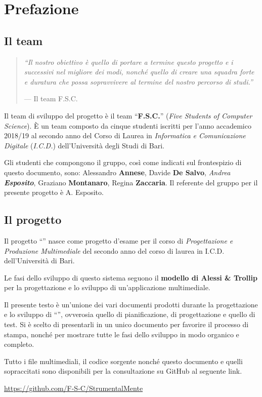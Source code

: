 \chapter*{Prefazione}
\section*{Il team}

\begin{quote}
\flushright \emph{``Il nostro obiettivo è quello di portare a termine questo progetto e i successivi nel migliore dei modi, nonché quello di creare una squadra forte e duratura che possa sopravvivere al termine del nostro percorso di studi.''}

--- Il team F.S.C.
\end{quote}

Il team di sviluppo del progetto è il team ``\textbf{F.S.C.}'' (\emph{Five Students of Computer Science}). È un team composto da cinque studenti iscritti per l'anno accademico 2018/19 al secondo anno del Corso di Laurea in \emph{Informatica e Comunicazione Digitale} (\emph{I.C.D.}) dell'Università degli Studi di Bari. 

Gli studenti che compongono il gruppo, così come indicati sul frontespizio di questo documento, sono: Alessandro \textbf{Annese}, Davide \textbf{De Salvo}, \emph{Andrea \textbf{Esposito}}, Graziano \textbf{Montanaro}, Regina \textbf{Zaccaria}. Il referente del gruppo per il presente progetto è A. Esposito.

\section*{Il progetto}
Il progetto ``\ProjectTitle{}'' nasce come progetto d'esame per il corso di \emph{Progettazione e Produzione Multimediale} del secondo anno del corso di laurea in I.C.D. dell'Università di Bari.

Le fasi dello sviluppo di questo sistema seguono il \textbf{modello di Alessi \& Trollip} per la progettazione e lo sviluppo di un'applicazione multimediale.

Il presente testo è un'unione dei vari documenti prodotti durante la progettazione e lo sviluppo di ``\ProjectTitle{}'', ovverosia quello di pianificazione, di progettazione e quello di test. Si è scelto di presentarli in un unico documento per favorire il processo di stampa, nonché per mostrare tutte le fasi dello sviluppo in modo organico e completo.

Tutto i file multimediali, il codice sorgente nonché questo documento e quelli sopraccitati sono disponibili per la consultazione su GitHub al seguente link.

\begin{center}
	\url{https://github.com/F-S-C/StrumentalMente}
\end{center}